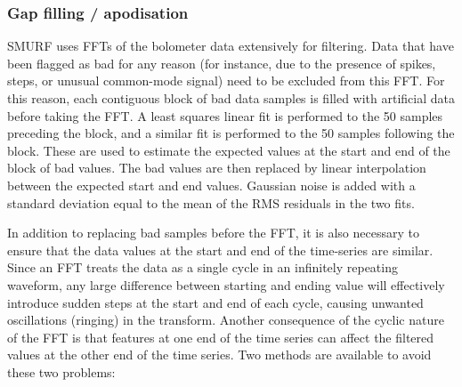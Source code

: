 \documentclass[useAMS,usenatbib,nofootinbib]{mn2e}
\begin{document}
\subsubsection{Gap filling / apodisation}
\label{sec:gaps}

SMURF uses FFTs of the bolometer data extensively for filtering.  Data
that have been flagged as bad for any reason (for instance, due to the
presence of spikes, steps, or unusual common-mode signal) need to be
excluded from this FFT. For this reason, each contiguous block of bad
data samples is filled with artificial data before taking the FFT. A
least squares linear fit is performed to the 50 samples preceding the
block, and a similar fit is performed to the 50 samples following the
block. These are used to estimate the expected values at the start and
end of the block of bad values. The bad values are then replaced by
linear interpolation between the expected start and end
values. Gaussian noise is added with a standard deviation equal to the
mean of the RMS residuals in the two fits.

In addition to replacing bad samples before the FFT, it is also
necessary to ensure that the data values at the start and end of the
time-series are similar. Since an FFT treats the data as a single
cycle in an infinitely repeating waveform, any large difference
between starting and ending value will effectively introduce sudden
steps at the start and end of each cycle, causing unwanted
oscillations (ringing) in the transform. Another consequence of the
cyclic nature of the FFT is that features at one end of the time
series can affect the filtered values at the other end of the time
series. Two methods are available to avoid these two problems:
\end{document}
